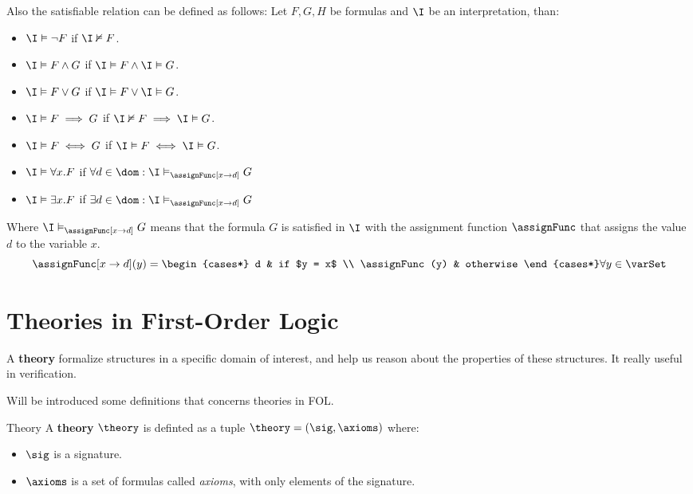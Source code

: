 Also the satisfiable relation can be defined as follows:
Let $F,G,H$ be formulas and $\I$ be an interpretation, than:
\begin{itemize}
    \item $\I \vDash \neg F$ if $\I \nvDash F$.
    \item $\I \vDash F \land G$ if $\I \vDash F \land \I \vDash G$.
    \item $\I \vDash F \lor G$ if $\I \vDash F \lor \I \vDash G$.
    \item $\I \vDash F \implies G$ if $\I \nvDash F \implies \I \vDash G$.
    \item $\I \vDash F \iff G$ if $\I \vDash F \iff \I \vDash G$.
    \item $\I \vDash \forall x.F$ if 
    $\forall d \in \dom : \I \vDash_{\assignFunc[x\rightarrow d]} G$  
    \item $\I \vDash \exists x.F$ if
    $\exists d \in \dom : \I \vDash_{\assignFunc[x\rightarrow d]} G$
\end{itemize}

Where $\I \vDash_{\assignFunc[x\rightarrow d]} G$ means that the formula $G$ is satisfied in $\I$
with the assignment function $\assignFunc$ that assigns the value $d$ to the variable $x$.
\begin{equation*}
    \assignFunc[x\rightarrow d](y) = 
    \begin{cases*}
        d & if $y = x$ \\
        \assignFunc(y) & otherwise
    \end{cases*}
    \forall y \in \varSet
\end{equation*}

\section{Theories in First-Order Logic}
\label{sec:Theories in First-Order Logic}

A \textbf{theory} formalize structures in a specific domain of interest, 
and help us reason about the properties of these structures.
It really useful in verification.

Will be introduced some definitions that concerns theories in FOL.

\begin{definition}{Theory}
    A \textbf{theory} $\theory$ is definted as a tuple $\theory = (\sig,\axioms)$ where:
    \begin{itemize}
        \item $\sig$ is a signature.
        \item $\axioms$ is a set of formulas called \textit{axioms},
        with only elements of the signature.
    \end{itemize}
\end{definition}

